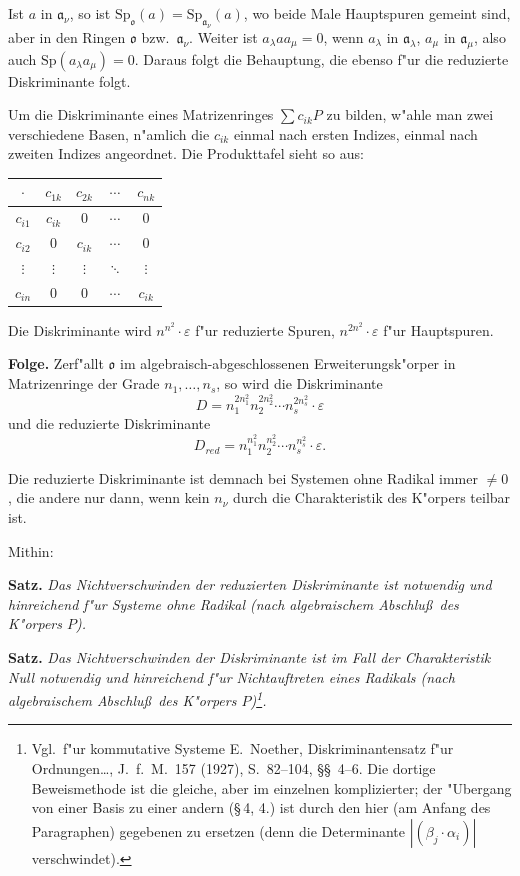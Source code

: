 \documentclass[12pt,a4paper]{article}
\theoremstyle{plain}
\newcommand{\Sp}{\mathrm{Sp}}
\begin{document}
Ist $a$ in $\mathfrak{a}_\nu$, so ist $\Sp_\mathfrak{o}(a) = \Sp_{\mathfrak{a}_\nu}(a)$, wo beide Male Hauptspuren gemeint sind, aber in den Ringen $\mathfrak{o}$ bzw.\ $\mathfrak{a}_\nu$. Weiter ist $a_\lambda a a_\mu = 0$, wenn $a_\lambda$ in $\mathfrak{a}_\lambda$, $a_\mu$ in $\mathfrak{a}_\mu$, also auch $\Sp(a_\lambda a_\mu) = 0$. Daraus folgt die Behauptung, die ebenso f"ur die reduzierte Diskriminante folgt.

\medskip
Um die Diskriminante eines Matrizenringes $\sum c_{ik}P$ zu bilden, w"ahle man zwei verschiedene Basen, n"amlich die $c_{ik}$ einmal nach ersten Indizes, einmal nach zweiten Indizes angeordnet. Die Produkttafel sieht so aus:

\begin{center}
\begin{tabular}{c|cccc}
$\cdot$ & $c_{1k}$ & $c_{2k}$ & $\cdots$ & $c_{nk}$ \\
\hline
$c_{i1}$ & $c_{ik}$ & $0$ & $\cdots$ & $0$ \\
$c_{i2}$ & $0$ & $c_{ik}$ & $\cdots$ & $0$ \\
$\vdots$ & $\vdots$ & $\vdots$ & $\ddots$ & $\vdots$ \\
$c_{in}$ & $0$ & $0$ & $\cdots$ & $c_{ik}$
\end{tabular}
\end{center}

Die Diskriminante wird $n^{n^2} \cdot \varepsilon$ f"ur reduzierte Spuren, $n^{2n^2} \cdot \varepsilon$ f"ur Hauptspuren.

\medskip\noindent\textbf{Folge.}
Zerf"allt $\mathfrak{o}$ im algebraisch-abgeschlossenen Erweiterungsk"orper in Matrizenringe der Grade $n_1,\ldots,n_s$, so wird die Diskriminante
\[
D = n_1^{2n_1^2} n_2^{2n_2^2} \cdots n_s^{2n_s^2} \cdot \varepsilon
\]
und die reduzierte Diskriminante
\[
D_{{red}} = n_1^{n_1^2} n_2^{n_2^2} \cdots n_s^{n_s^2} \cdot \varepsilon.
\]

Die reduzierte Diskriminante ist demnach bei Systemen ohne Radikal immer $\neq 0$, die andere nur dann, wenn kein $n_\nu$ durch die Charakteristik des K"orpers teilbar ist.

Mithin:

\medskip\noindent\textbf{Satz.}
\textit{Das Nichtverschwinden der reduzierten Diskriminante ist notwendig und hinreichend f"ur Systeme ohne Radikal (nach algebraischem Abschlu\ss\ des K"orpers $P$).}

\medskip\noindent\textbf{Satz.}
\textit{Das Nichtverschwinden der Diskriminante ist im Fall der Charakteristik Null notwendig und hinreichend f"ur Nichtauftreten eines Radikals (nach algebraischem Abschlu\ss\ des K"orpers $P$)\footnote{Vgl.\ f"ur kommutative Systeme E.\ Noether, Diskriminantensatz f"ur Ordnungen\ldots, J.\ f.\ M.\ 157 (1927), S.\ 82--104, \S\S\ 4--6. Die dortige Beweismethode ist die gleiche, aber im einzelnen komplizierter; der "Ubergang von einer Basis zu einer andern (\S\,4, 4.) ist durch den hier (am Anfang des Paragraphen) gegebenen zu ersetzen (denn die Determinante $|(\beta_j \cdot \alpha_i)|$ verschwindet).}.}
\end{document}
